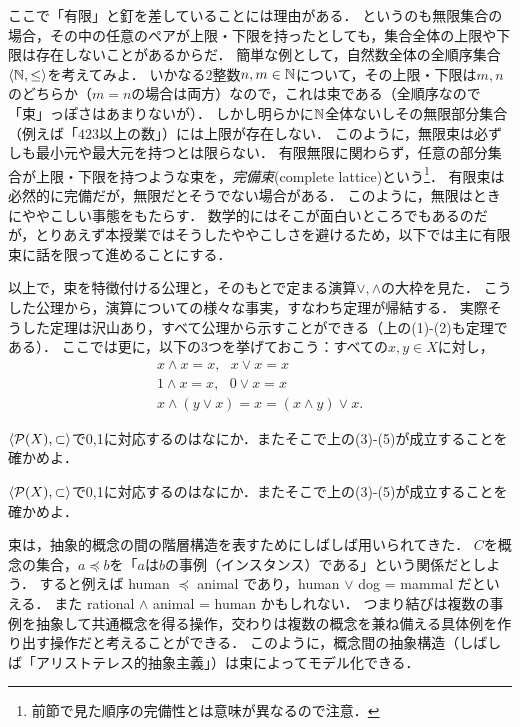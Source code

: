 \documentclass[11pt,a4paper]{jsarticle}
\begin{document}
\begin{attn}
ここで「有限」と釘を差していることには理由がある．
というのも無限集合の場合，その中の任意のペアが上限・下限を持ったとしても，集合全体の上限や下限は存在しないことがあるからだ．
簡単な例として，自然数全体の全順序集合$\langle \mathbb{N}, \leq \rangle$を考えてみよ．
いかなる2整数$n, m \in \mathbb{N}$について，その上限・下限は$m,n$のどちらか（$m=n$の場合は両方）なので，これは束である（全順序なので「束」っぽさはあまりないが）．
しかし明らかに$\mathbb{N}$全体ないしその無限部分集合（例えば「$423$以上の数」）には上限が存在しない．
このように，無限束は必ずしも最小元や最大元を持つとは限らない．
有限無限に関わらず，任意の部分集合が上限・下限を持つような束を，\emph{完備束}(complete lattice)という\footnote{前節で見た順序の完備性とは意味が異なるので注意．}．
有限束は必然的に完備だが，無限だとそうでない場合がある．
このように，無限はときにややこしい事態をもたらす．
数学的にはそこが面白いところでもあるのだが，とりあえず本授業ではそうしたややこしさを避けるため，以下では主に有限束に話を限って進めることにする． 
\end{attn}

以上で，束を特徴付ける公理と，そのもとで定まる演算$\vee, \wedge$の大枠を見た．
こうした公理から，演算についての様々な事実，すなわち定理が帰結する．
実際そうした定理は沢山あり，すべて公理から示すことができる（上の(1)-(2)も定理である）．
ここでは更に，以下の3つを挙げておこう：すべての$x, y \in X$に対し，
\begin{align}
 x \wedge x = x, \ \ \ x \vee x = x \\
 1 \wedge x = x, \ \ \ 0 \vee x = x \\
 x \wedge (y \vee x) = x = (x \wedge y) \vee x .
\end{align}

\begin{exercise}
 $\langle \mathcal{P}(X), \subset \rangle$で0,1に対応するのはなにか．またそこで上の(3)-(5)が成立することを確かめよ．
\end{exercise}


\begin{exercise}
 $\langle \mathcal{P}(X), \subset \rangle$で0,1に対応するのはなにか．またそこで上の(3)-(5)が成立することを確かめよ．
\end{exercise}

\begin{example}
束は，抽象的概念の間の階層構造を表すためにしばしば用いられてきた．
$C$を概念の集合，$a \preceq b$を「$a$は$b$の事例（インスタンス）である」という関係だとしよう．
すると例えば human $\preceq$ animal であり，human $\vee$ dog = mammal だといえる．
また rational $\wedge$ animal = human かもしれない．
つまり結びは複数の事例を抽象して共通概念を得る操作，交わりは複数の概念を兼ね備える具体例を作り出す操作だと考えることができる．
このように，概念間の抽象構造（しばしば「アリストテレス的抽象主義」）は束によってモデル化できる．
\end{example}
\end{document}
